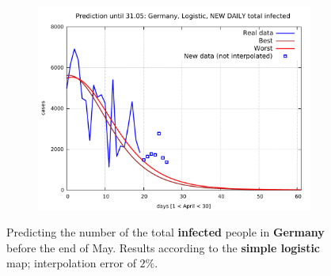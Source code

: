 \documentclass[8pt]{article}
\begin{document}
\begin{figure}[h!]
\begin{subfigure}[b]{0.48\linewidth}
  \includegraphics[width=\linewidth]{../de_l_t/peak/peak_prediction.pdf}
  \end{subfigure}
  \caption{Predicting the number of the total \textbf{infected}
	people in \textbf{Germany}
	before the end of May. Results according to the 
	\textbf{simple logistic}
	map; interpolation error of $2\%$.}
\end{figure}
\end{document}
